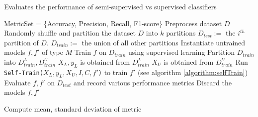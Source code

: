 \documentclass[../main.tex]{subfiles}
\begin{document}

\begin{algorithm}
\caption{Evaluates the performance of semi-supervised vs supervised classifiers}
\label{algorithm:evaluation}
\begin{algorithmic}[1]
    \State MetricSet = \{Accuracy, Precision, Recall, F1-score\}
    \State Preprocess dataset $D$
    \State Randomly shuffle and partition the dataset $D$ into $k$ partitions
        \State $D_{test} :=$ the $i^{th}$ partition of $D$.
        \State $D_{train} :=$ the union of all other partitions
        \State Instantiate untrained models $f,f'$ of type $M$
        \State Train $f$ on $D_{train}$ using supervised learning
        \State Partition $D_{train}$ into $D_{train}^L, D_{train}^U$
        \State $X_L, y_L$ is obtained from $D_{train}^L$  
        \State $X_U$ is obtained from $D_{train}^U$
        \State Run \texttt{Self-Train($X_L, y_L, X_U, I, C, f'$)} to train $f'$ (see algorithm \ref{algorithm:selfTrain})
        \State Evaluate $f, f'$ on $D_{test}$ and record various performance metrics
        \State Discard the models $f, f'$
    \EndFor
    
        \State Compute mean, standard deviation of metric
    \EndFor
\EndProcedure
\end{algorithmic}
\end{algorithm}
\end{document}
